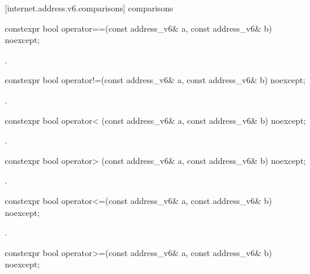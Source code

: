 [internet.address.v6.comparisons]{ comparisons}

%
\begin{itemdecl}
constexpr bool operator==(const address_v6& a, const address_v6& b) noexcept;
\end{itemdecl}

\begin{itemdescr}
\pnum
\returns {}.
\end{itemdescr}

%
\begin{itemdecl}
constexpr bool operator!=(const address_v6& a, const address_v6& b) noexcept;
\end{itemdecl}

\begin{itemdescr}
\pnum
\returns {}.
\end{itemdescr}

%
\begin{itemdecl}
constexpr bool operator< (const address_v6& a, const address_v6& b) noexcept;
\end{itemdecl}

\begin{itemdescr}
\pnum
\returns {}.
\end{itemdescr}

%
\begin{itemdecl}
constexpr bool operator> (const address_v6& a, const address_v6& b) noexcept;
\end{itemdecl}

\begin{itemdescr}
\pnum
\returns {}.
\end{itemdescr}

%
\begin{itemdecl}
constexpr bool operator<=(const address_v6& a, const address_v6& b) noexcept;
\end{itemdecl}

\begin{itemdescr}
\pnum
\returns {}.
\end{itemdescr}

%
\begin{itemdecl}
constexpr bool operator>=(const address_v6& a, const address_v6& b) noexcept;
\end{itemdecl}

